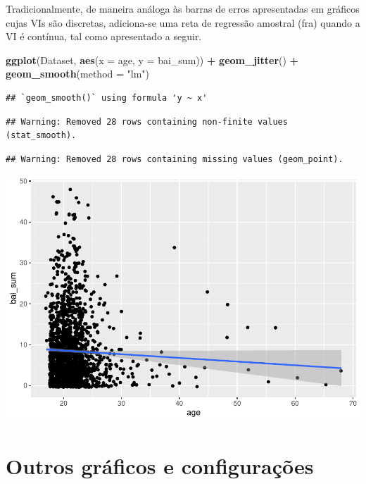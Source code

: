 \documentclass[
]{book}
\newenvironment{Shaded}{\begin{snugshade}}{\end{snugshade}}
\newcommand{\DataTypeTok}[1]{\textcolor[rgb]{0.13,0.29,0.53}{#1}}
\newcommand{\KeywordTok}[1]{\textcolor[rgb]{0.13,0.29,0.53}{\textbf{#1}}}
\newcommand{\NormalTok}[1]{#1}
\newcommand{\OperatorTok}[1]{\textcolor[rgb]{0.81,0.36,0.00}{\textbf{#1}}}
\newcommand{\StringTok}[1]{\textcolor[rgb]{0.31,0.60,0.02}{#1}}
\begin{document}
Tradicionalmente, de maneira análoga às barras de erros apresentadas em gráficos cujas VIs são discretas, adiciona-se uma reta de regressão amostral (fra) quando a VI é contínua, tal como apresentado a seguir.

\begin{Shaded}
\begin{Highlighting}[]
\KeywordTok{ggplot}\NormalTok{(Dataset, }\KeywordTok{aes}\NormalTok{(}\DataTypeTok{x =}\NormalTok{ age, }\DataTypeTok{y =}\NormalTok{ bai_sum)) }\OperatorTok{+}
\StringTok{  }\KeywordTok{geom_jitter}\NormalTok{() }\OperatorTok{+}
\StringTok{  }\KeywordTok{geom_smooth}\NormalTok{(}\DataTypeTok{method =} \StringTok{"lm"}\NormalTok{)}
\end{Highlighting}
\end{Shaded}

\begin{verbatim}
## `geom_smooth()` using formula 'y ~ x'
\end{verbatim}

\begin{verbatim}
## Warning: Removed 28 rows containing non-finite values (stat_smooth).
\end{verbatim}

\begin{verbatim}
## Warning: Removed 28 rows containing missing values (geom_point).
\end{verbatim}

\begin{center}\includegraphics{gitbook-demo_files/figure-latex/unnamed-chunk-24-1} \end{center}

\hypertarget{outros-gruxe1ficos-e-configurauxe7uxf5es}{%
\section{Outros gráficos e configurações}\label{outros-gruxe1ficos-e-configurauxe7uxf5es}}
\end{document}
